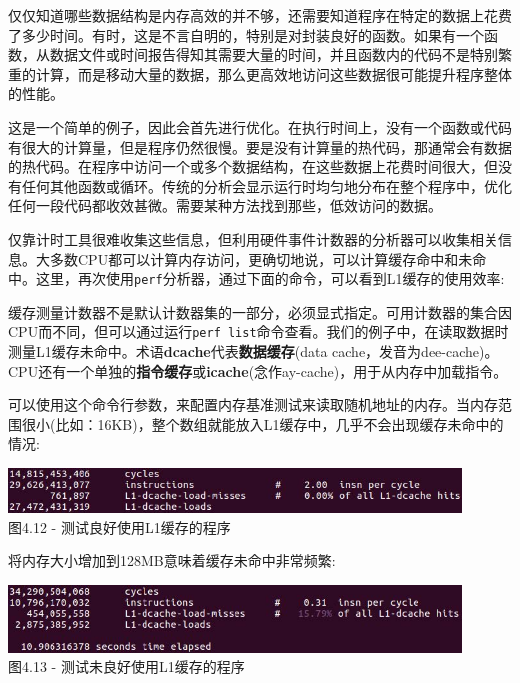仅仅知道哪些数据结构是内存高效的并不够，还需要知道程序在特定的数据上花费了多少时间。有时，这是不言自明的，特别是对封装良好的函数。如果有一个函数，从数据文件或时间报告得知其需要大量的时间，并且函数内的代码不是特别繁重的计算，而是移动大量的数据，那么更高效地访问这些数据很可能提升程序整体的性能。

这是一个简单的例子，因此会首先进行优化。在执行时间上，没有一个函数或代码有很大的计算量，但是程序仍然很慢。要是没有计算量的热代码，那通常会有数据的热代码。在程序中访问一个或多个数据结构，在这些数据上花费时间很大，但没有任何其他函数或循环。传统的分析会显示运行时均匀地分布在整个程序中，优化任何一段代码都收效甚微。需要某种方法找到那些，低效访问的数据。

仅靠计时工具很难收集这些信息，但利用硬件事件计数器的分析器可以收集相关信息。大多数CPU都可以计算内存访问，更确切地说，可以计算缓存命中和未命中。这里，再次使用\texttt{perf}分析器，通过下面的命令，可以看到L1缓存的使用效率:


缓存测量计数器不是默认计数器集的一部分，必须显式指定。可用计数器的集合因CPU而不同，但可以通过运行\texttt{perf list}命令查看。我们的例子中，在读取数据时测量L1缓存未命中。术语\textbf{dcache}代表\textbf{数据缓存}(data cache，发音为dee-cache)。CPU还有一个单独的\textbf{指令缓存}或\textbf{icache}(念作ay-cache)，用于从内存中加载指令。

可以使用这个命令行参数，来配置内存基准测试来读取随机地址的内存。当内存范围很小(比如：16KB)，整个数组就能放入L1缓存中，几乎不会出现缓存未命中的情况:

\begin{center}
\includegraphics[width=0.9\textwidth]{content/1/chapter4/images/12.jpg}\\
图4.12 - 测试良好使用L1缓存的程序
\end{center}

将内存大小增加到128MB意味着缓存未命中非常频繁:

\begin{center}
\includegraphics[width=0.9\textwidth]{content/1/chapter4/images/13.jpg}\\
图4.13 - 测试未良好使用L1缓存的程序
\end{center}

